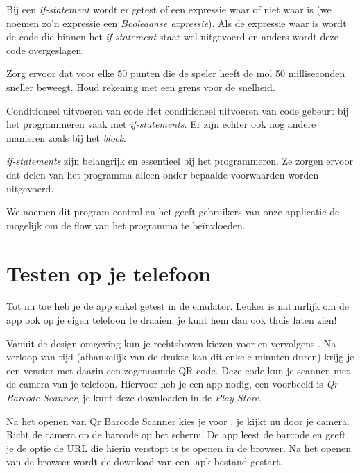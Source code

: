 Bij een \emph{if-statement} wordt er getest of een expressie waar of niet waar is (we noemen zo'n expressie een \emph{Booleaanse expressie}). Als de expressie waar is wordt de code die binnen het \emph{if-statement} staat wel uitgevoerd en anders wordt deze code overgeslagen.

\begin{opgave}
    \opgVraag
	Zorg ervoor dat voor elke 50 punten die de speler heeft de mol 50 milliseconden sneller beweegt. Houd rekening met een grens voor de snelheid.
\end{opgave}

\begin{derivation}{Conditioneel uitvoeren van code}
Het conditioneel uitvoeren van code gebeurt bij het programmeren vaak met \emph{if-statements}. Er zijn echter ook nog andere manieren zoals bij \ai het  \emph{block}.

\emph{if-statements} zijn belangrijk en essentieel bij het programmeren. Ze zorgen ervoor dat delen van het programma alleen onder bepaalde voorwaarden worden uitgevoerd.

We noemen dit program control en het geeft gebruikers van onze applicatie de mogelijk om de flow van het programma te be\"invloeden.
\end{derivation}


\section{Testen op je telefoon}
\runOpTelefoon{} Tot nu toe heb je de app enkel getest in de emulator. Leuker is natuurlijk om de app ook op je eigen telefoon te draaien, je kunt hem dan ook thuis laten zien!

Vanuit de design omgeving kun je rechtsboven kiezen voor  en vervolgens . Na verloop van tijd (afhankelijk van de drukte kan dit enkele minuten duren) krijg je een venster met daarin een zogenaamde QR-code. Deze code kun je scannen met de camera van je telefoon. Hiervoor heb je een app nodig, een voorbeeld is \emph{Qr Barcode Scanner}, je kunt deze downloaden in de \emph{Play Store}.

Na het openen van Qr Barcode Scanner kies je voor , je kijkt nu door je camera. Richt de camera op de barcode op het scherm. De app leest de barcode en geeft je de optie de URL die hierin verstopt is te openen in de browser. Na het openen van de browser wordt de download van een .apk bestand gestart. 

